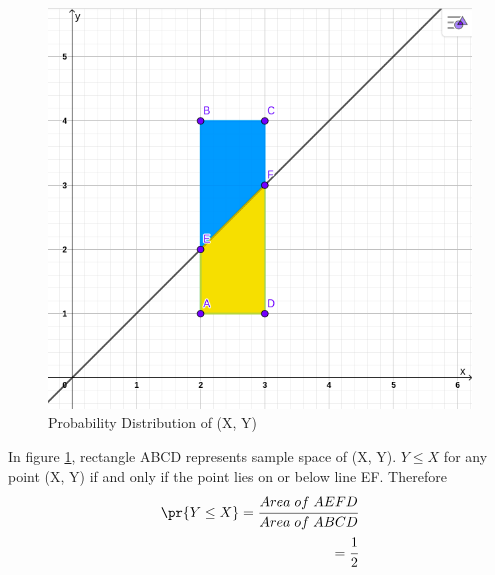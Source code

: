 
\begin{figure}[!ht]
\centering
\includegraphics[width=\columnwidth]{solutions/in/2021/figures/figure.png}
\caption{Probability Distribution of (X, Y)}
\label{fig:Nuruhuhuhuhuhuhu}
\end{figure}

In figure \ref{fig:Nuruhuhuhuhuhuhu}, rectangle ABCD represents sample space of (X, Y). $Y \le X$ for any point (X, Y) if and only if the point lies on or below line EF. Therefore 
\begin{align}
    \pr{Y \le X} = \cfrac{Area\; of\; AEFD}{Area\; of\; ABCD}\\
                 = \cfrac{1}{2}    
\end{align}

